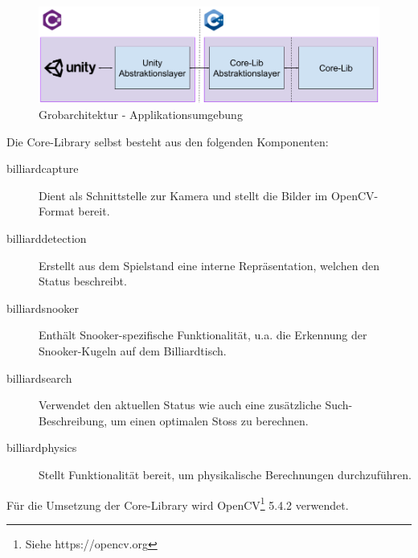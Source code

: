 \begin{figure}[h!]
    \begin{center}
        \includegraphics[width=0.8\linewidth]{../common/03_billiard_ai/resources/00_top_level_architecture.png}
    \end{center}
    \caption{Grobarchitektur - Applikationsumgebung}
    \label{fig:top-level-architecture}
\end{figure}

Die Core-Library selbst besteht aus den folgenden Komponenten:
\begin{description}
    \item[billiard\textunderscore capture] Dient als Schnittstelle zur Kamera und stellt die Bilder im OpenCV-Format bereit.
    \item[billiard\textunderscore detection] Erstellt aus dem Spielstand eine interne Repräsentation, welchen den Status beschreibt.
    \item[billiard\textunderscore snooker] Enthält Snooker-spezifische Funktionalität, u.a. die Erkennung der Snooker-Kugeln auf dem Billiardtisch.
    \item[billiard\textunderscore search] Verwendet den aktuellen Status wie auch eine zusätzliche Such-Beschreibung, um einen optimalen
    Stoss zu berechnen.
    \item[billiard\textunderscore physics] Stellt Funktionalität bereit, um physikalische Berechnungen durchzuführen.
\end{description}

Für die Umsetzung der Core-Library wird OpenCV\footnote{Siehe https://opencv.org} 5.4.2 verwendet.




